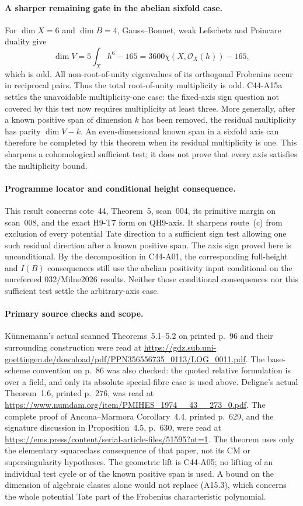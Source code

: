 \documentclass[11pt]{article}
\theoremstyle{remark}\newtheorem{remark}[theorem]{Remark}
\begin{document}
\paragraph{A sharper remaining gate in the abelian sixfold case.}
For $\dim X=6$ and $\dim B=4$, Gauss--Bonnet, weak Lefschetz
and Poincare duality give
\[
        \dim V=5\int_Xh^6-165=3600\chi(X,\mathcal O_X(h))-165,
 \tag{A15.16}
\]
which is odd. All non-root-of-unity eigenvalues of its
orthogonal Frobenius occur in reciprocal pairs. Thus the
total root-of-unity multiplicity is odd. C44-A15a settles
the unavoidable multiplicity-one case: the fixed-axis sign
question not covered by this test now requires multiplicity
at least three. More generally, after a known positive span
of dimension $k$ has been removed, the residual multiplicity
has parity $\dim V-k$. An even-dimensional known span in a
sixfold axis can therefore be completed by this theorem
when its residual multiplicity is one. This sharpens a
cohomological sufficient test; it does not prove that every
axis satisfies the multiplicity bound.

\paragraph{Programme locator and conditional height consequence.}
This result concerns cote~44, Theorem~5, scan~004, its primitive
margin on scan~008, and the exact H9-T7 form on QH9-axis.
It sharpens route~(c) from exclusion of every potential Tate
direction to a sufficient sign test allowing one such residual
direction after a known positive span. The axis sign proved
here is unconditional. By the decomposition in C44-A01, the
corresponding full-height and $I(B)$ consequences still use
the abelian positivity input conditional on the unrefereed
032/Milne2026 results. Neither those conditional consequences
nor this sufficient test settle the arbitrary-axis case.

\paragraph{Primary source checks and scope.}
K\"unnemann's actual scanned Theorems~5.1--5.2 on printed
p.~96 and their surrounding construction were read at
\url{https://gdz.sub.uni-goettingen.de/download/pdf/PPN356556735_0113/LOG_0011.pdf}.
The base-scheme convention on p.~86 was also checked: the
quoted relative formulation is over a field, and only its
absolute special-fibre case is used above. Deligne's actual
Theorem~1.6, printed p.~276, was read at
\url{https://www.numdam.org/item/PMIHES_1974__43__273_0.pdf}.
The complete proof of Ancona--Marmora Corollary~4.4, printed
p.~629, and the signature discussion in Proposition~4.5,
p.~630, were read at
\url{https://ems.press/content/serial-article-files/51595?nt=1}.
The theorem uses only the elementary squareclass consequence
of that paper, not its CM or supersingularity hypotheses.
The geometric lift is C44-A05; no lifting of an individual
test cycle or of the known positive span is used. A bound on
the dimension of algebraic classes alone would not replace
(A15.3), which concerns the whole potential Tate part of the
Frobenius characteristic polynomial.
\end{document}
